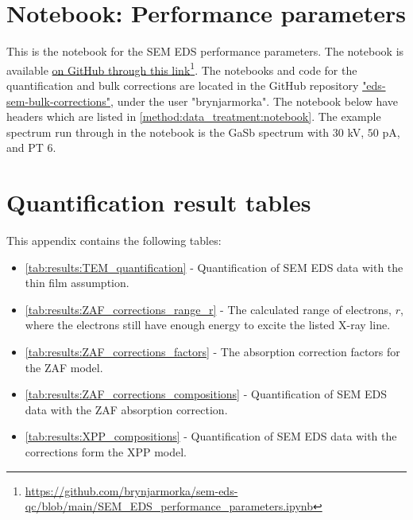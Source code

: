 


\chapter{Notebook: Performance parameters}
\label{appendix:performance}

This is the notebook for the SEM EDS performance parameters.
The notebook is available \href{https://github.com/brynjarmorka/sem-eds-qc/blob/main/SEM_EDS_performance_parameters.ipynb}{on GitHub through this link}\footnote{\url{https://github.com/brynjarmorka/sem-eds-qc/blob/main/SEM_EDS_performance_parameters.ipynb}}. 
The notebooks and code for the quantification and bulk corrections are located in the GitHub repository \href{https://github.com/brynjarmorka/eds-sem-bulk-corrections}{"eds-sem-bulk-corrections"}, under the user "brynjarmorka".
The notebook below have headers which are listed in \cref{method:data_treatment:notebook}.
The example spectrum run through in the notebook is the GaSb spectrum with $30$ kV, $50$ pA, and PT $6$.


\restoregeometry %








\chapter{Quantification result tables}
\label{appendix:tables}

This appendix contains the following tables:

\begin{itemize}
    \item \cref{tab:results:TEM_quantification} - Quantification of SEM EDS data with the thin film assumption.
    \item \cref{tab:results:ZAF_corrections_range_r} - The calculated range of electrons, $r$, where the electrons still have enough energy to excite the listed X-ray line.
    \item \cref{tab:results:ZAF_corrections_factors} - The absorption correction factors for the ZAF model.
    \item \cref{tab:results:ZAF_corrections_compositions} - Quantification of SEM EDS data with the ZAF absorption correction.
    \item \cref{tab:results:XPP_compositions} - Quantification of SEM EDS data with the corrections form the XPP model.    
\end{itemize}

